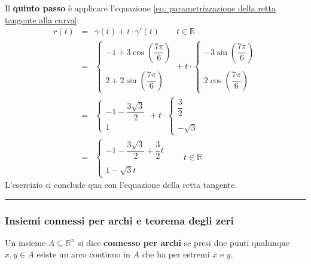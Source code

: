 \documentclass[a4paper]{article}
\newcommand{\longline}{\noindent\rule{\textwidth}{0.4pt}}
\newcommand{\definition}[1]{\textcolor{Red3}{\textbf{#1}}}
\begin{document}
	\noindent
	Il \textbf{quinto passo} è applicare l'equazione \ref{eq: parametrizzazione della retta tangente alla curva}:
	\begin{equation*}
		\begin{array}{rcl}
			r\left(t\right) &=& \gamma\left(t\right) + t \cdot \gamma'\left(t\right) \hspace{2em} t \in \mathbb{R} \\ [1em]
			&=& \begin{cases}
				-1 + 3 \cos\left(\dfrac{7\pi}{6}\right) \\
				\\
				2  + 2 \sin\left(\dfrac{7\pi}{6}\right)
			\end{cases}
			+
			t \cdot
			\begin{cases}
				-3\sin\left(\dfrac{7\pi}{6}\right) \\ \\
				2\cos\left(\dfrac{7\pi}{6}\right)
			\end{cases} \\ [3.5em]
			&=& 
			\begin{cases}
				-1-\dfrac{3\sqrt{3}}{2} \\
				1
			\end{cases}
			+
			t \cdot
			\begin{cases}
				\dfrac{3}{2} \\ \\
				-\sqrt{3}
			\end{cases} \\ [3em]
			&=&
			\begin{cases}
				-1-\dfrac{3\sqrt{3}}{2} + \dfrac{3}{2}t \\ \\
				1 - \sqrt{3} t
			\end{cases}
			\hspace{2em}
			t \in \mathbb{R}
		\end{array}
	\end{equation*}
	L'esercizio si conclude qua con l'equazione della retta tangente.
	
	\longline

	\subsubsection{Insiemi connessi per archi e teorema degli zeri}\label{subsubsection: insiemi connessi per archi e teorema degli zeri}

	\begin{boxdef}
		Un insieme $A \subseteq \mathbb{R}^{n}$ si dice \definition{connesso per archi} se presi due punti qualunque $x,y\in A$ esiste un arco continuo in $A$ che ha per estremi $x$ e $y$.
	\end{boxdef}
\end{document}
